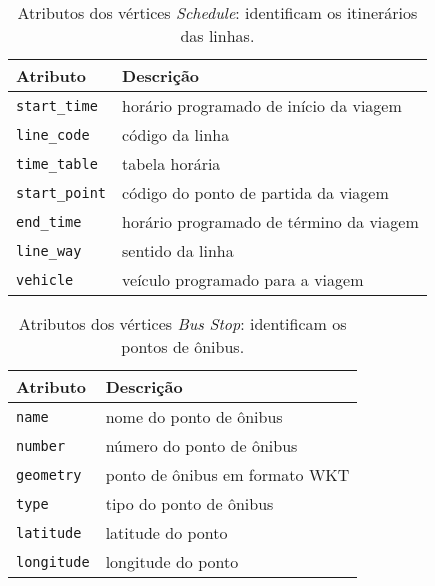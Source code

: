 \begin{table}[htb]
    \caption{Atributos dos vértices \emph{Schedule}:  identificam os itinerários das linhas.}
    \label{tab:vertice_schedule}
    \centering
    \footnotesize
    \begin{tabular}{p{2.5cm}p{6cm}} 
        \hline
        Atributo & Descrição\\
        \hline
        \texttt{start\_time} & horário programado de início da viagem \\
        \texttt{line\_code} & código da linha \\
        \texttt{time\_table} & tabela horária \\
        \texttt{start\_point} & código do ponto de partida da viagem \\
        \texttt{end\_time} & horário programado de término da viagem \\
        \texttt{line\_way} & sentido da linha \\
        \texttt{vehicle} & veículo programado para a viagem \\
        \hline  
    \end{tabular}
\end{table}


\begin{table}[!htb]
    \caption{Atributos dos vértices \emph{Bus Stop}:  identificam os pontos de ônibus.}
    \label{tab:vertice_busstop}
    \centering
    \footnotesize
    \begin{tabular}{p{2.5cm}p{5cm}} 
        \hline
        Atributo & Descrição\\
        \hline
        \texttt{name} & nome do ponto de ônibus  \\
        \texttt{number} & número do ponto de ônibus \\
        \texttt{geometry} & ponto de ônibus em formato WKT \\
        \texttt{type} & tipo do ponto de ônibus \\
        \texttt{latitude} & latitude do ponto \\
        \texttt{longitude} & longitude do ponto \\
        \hline
    \end{tabular}
\end{table}


